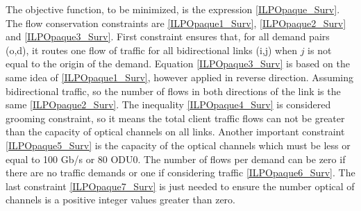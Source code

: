 \vspace{10pt}

The objective function, to be minimized, is the expression \ref{ILPOpaque_Surv}. The flow conservation constraints are \ref{ILPOpaque1_Surv}, \ref{ILPOpaque2_Surv} and \ref{ILPOpaque3_Surv}. First constraint ensures that, for all demand pairs (o,d), it routes one flow of traffic for all bidirectional links (i,j) when $j$ is not equal to the origin of the demand. Equation \ref{ILPOpaque3_Surv} is based on the same idea of \ref{ILPOpaque1_Surv}, however applied in reverse direction. Assuming bidirectional traffic, so the number of flows in both directions of the link is the same \ref{ILPOpaque2_Surv}. The inequality \ref{ILPOpaque4_Surv} is considered grooming constraint, so it means the total client traffic flows can not be greater than the capacity of optical channels on all links. Another important constraint \ref{ILPOpaque5_Surv} is the capacity of the optical channels which must be less or equal to 100 Gb/s or 80 ODU0. The number of flows per demand can be zero if there are no traffic demands or one if considering traffic \ref{ILPOpaque6_Surv}. The last constraint \ref{ILPOpaque7_Surv} is just needed to ensure the number optical of channels is a positive integer values greater than zero.\\

